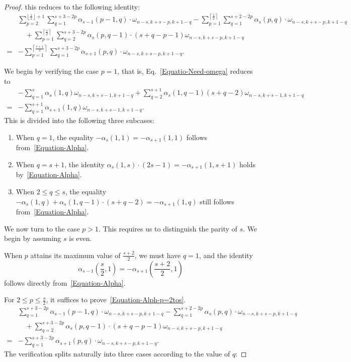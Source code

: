 \documentclass[reqno, 12pt]{article}
\theoremstyle{mydefinition}
\theoremstyle{myremark}
\numberwithin{algorithm}{section}
\begin{document}
\begin{proof}
this reduces to the following identity:
\begin{align}
& \sum_{p=2}^{\left\lfloor \frac{s}{2}\right\rfloor+1} \sum_{q=1}^{s+3-2p} \alpha_{s-1}(p-1,q)\cdot \omega_{n-s,k+s-p,k+1-q}
 -\sum_{p=1}^{\left\lceil \frac{s}{2}\right\rceil} \sum_{q=1}^{s+2-2p} \alpha_{s}(p,q)\cdot \omega_{n-s,k+s-p,k+1-q}  \nonumber
\\ &\quad +\sum_{p=1}^{\left\lceil \frac{s}{2}\right\rceil} \sum_{q=2}^{s+3-2p} \alpha_{s}(p,q-1)\cdot (s+q-p-1)\omega_{n-s, k+s-p, k+1-q}\label{Equatio-Need-omega}
\\= &-\sum_{p=1}^{\left\lceil \frac{s+1}{2}\right\rceil} \sum_{q=1}^{s+3-2p} \alpha_{s+1}(p,q)\cdot \omega_{n-s,k+s-p,k+1-q}. \nonumber
\end{align}

We begin by verifying the case $p=1$, that is,  Eq.~\eqref{Equatio-Need-omega} reduces to
\begin{align*}
&-\sum_{q=1}^{s}\alpha_s(1,q) \omega_{n-s,k+s-1,k+1-q}+\sum_{q=2}^{s+1}\alpha_s(1,q-1)(s+q-2)\omega_{n-s,k+s-1,k+1-q}
\\ =&-\sum_{q=1}^{s+1}\alpha_{s+1}(1,q)\omega_{n-s,k+s-1,k+1-q}.
\end{align*}
This is divided into the following three subcases:
\begin{enumerate}
\item When $q=1$, the equality $-\alpha_s(1,1)=-\alpha_{s+1}(1,1)$ follows from~\eqref{Equation-Alpha}.
\item When $q=s+1$, the identity $\alpha_s(1,s)\cdot (2s-1)=-\alpha_{s+1}(1,s+1)$ holds by~\eqref{Equation-Alpha}.
\item When $2\leq q\leq s$, the equality $-\alpha_s(1,q)+\alpha_s(1,q-1)\cdot (s+q-2)=-\alpha_{s+1}(1,q)$ still follows from~\eqref{Equation-Alpha}.
\end{enumerate}

We now turn to the case $p>1$. This requires us to distinguish the parity of $s$. We begin by assuming $s$ is even.

When $p$ attains its maximum value of $\frac{s+2}{2}$, we must have $q=1$, and the identity
\[
\alpha_{s-1}\left(\frac{s}{2},1\right)=-\alpha_{s+1}\left(\frac{s+2}{2},1\right)
\]
follows directly from~\eqref{Equation-Alpha}.

For $2\leq p\leq \frac{s}{2}$, it suffices to prove~\eqref{Equation-Alph-p=2tos}.
\begin{align}
& \sum_{q=1}^{s+3-2p} \alpha_{s-1}(p-1,q)\cdot \omega_{n-s,k+s-p,k+1-q}
 -\sum_{q=1}^{s+2-2p} \alpha_{s}(p,q)\cdot \omega_{n-s,k+s-p,k+1-q} \nonumber
\\ &\quad +\sum_{q=2}^{s+3-2p} \alpha_{s}(p,q-1)\cdot (s+q-p-1)\omega_{n-s, k+s-p, k+1-q} \label{Equation-Alph-p=2tos}
\\= &- \sum_{q=1}^{s+3-2p} \alpha_{s+1}(p,q)\cdot \omega_{n-s,k+s-p,k+1-q}.\nonumber
\end{align}
The verification splits naturally into three cases according to the value of $q$:


\end{proof}
\end{document}
